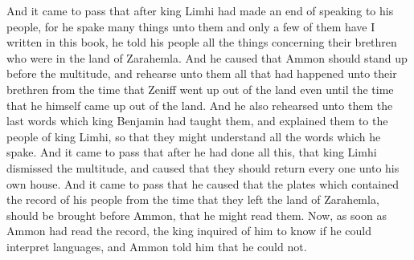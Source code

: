 \bchapter
\bverse \iffalse And it came to pass that after king Limhi had made an end of speaking to his people, for he spake many things unto them and only a few of them have I written in this book, he told his people all the things concerning their brethren who were in the land of Zarahemla. \fi
And it came to pass that after king Limhi had made an end of speaking to his people, for he spake many things unto them and only a few of them have I written in this book, he told his people all the things concerning their brethren who were in the land of Zarahemla.
\bverse \iffalse And he caused that Ammon should stand up before the multitude, and rehearse unto them all that had happened unto their brethren from the time that Zeniff went up out of the land even until the time that he himself came up out of the land. \fi
And he caused that Ammon should stand up before the multitude, and rehearse unto them all that had happened unto their brethren from the time that Zeniff went up out of the land even until the time that he himself came up out of the land.
\bverse \iffalse And he also rehearsed unto them the last words which king Benjamin had taught them, and explained them to the people of king Limhi, so that they might understand all the words which he spake. \fi
And he also rehearsed unto them the last words which king Benjamin had taught them, and explained them to the people of king Limhi, so that they might understand all the words which he spake.
\bverse \iffalse And it came to pass that after he had done all this, that king Limhi dismissed the multitude, and caused that they should return every one unto his own house. \fi
And it came to pass that after he had done all this, that king Limhi dismissed the multitude, and caused that they should return every one unto his own house.
\bverse \iffalse And it came to pass that he caused that the plates which contained the record of his people from the time that they left the land of Zarahemla, should be brought before Ammon, that he might read them. \fi
And it came to pass that he caused that the plates which contained the record of his people from the time that they left the land of Zarahemla, should be brought before Ammon, that he might read them.
\bverse \iffalse Now, as soon as Ammon had read the record, the king inquired of him to know if he could interpret languages, and Ammon told him that he could not. \fi
Now, as soon as Ammon had read the record, the king inquired of him to know if he could interpret languages, and Ammon told him that he could not.
